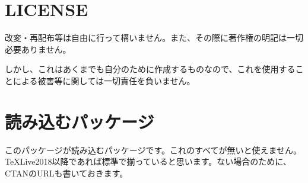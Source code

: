 \documentclass[lualatex,ja=standard,a4paper]{bxjsarticle}
\begin{document}
\section{LICENSE}
改変・再配布等は自由に行って構いません。また、その際に著作権の明記は一切必要ありません。

しかし、これはあくまでも自分のために作成するものなので、これを使用することによる被害等に関しては一切責任を負いません。

\section{読み込むパッケージ}
このパッケージが読み込むパッケージです。これのすべてが無いと使えません。TeXLive2018以降であれば標準で揃っていると思います。ない場合のために、CTANのURLも書いておきます。
\end{document}
